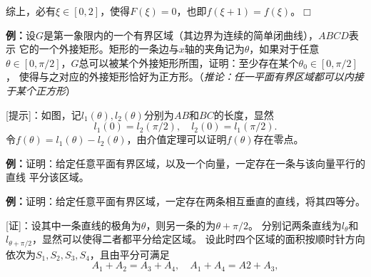 综上，必有$\xi\in[0,2]$，使得$F(\xi)=0$，也即$f(\xi+1)=f(\xi)$。\hfill $\Box$

{\bf 例：}设$G$是第一象限内的一个有界区域（其边界为连续的简单闭曲线），$ABCD$表示
它的一个外接矩形。矩形的一条边与$x$轴的夹角记为$\theta$，如果对于任意$\theta\in
[0,\pi/2]$，$G$总可以被某个外接矩形所围，证明：至少存在某个$\theta_0\in[0,\pi/2]$，
使得与之对应的外接矩形恰好为正方形。（{\it 推论：任一平面有界区域都可以内接于某个正方形}）

\begin{center}
\end{center}

[提示]：如图，记$l_1(\theta),l_2(\theta)$分别为$AB$和$BC$的长度，显然
$$l_1(0)=l_2(\pi/2),\quad l_2(0)=l_1(\pi/2).$$
令$f(\theta)=l_1(\theta)-l_2(\theta)$，由介值定理可以证明$f(\theta)$存在零点。

{\bf 例：}证明：给定任意平面有界区域，以及一个向量，一定存在一条与该向量平行的直线
平分该区域。

{\bf 例：}证明：给定任意平面有界区域，一定存在两条相互垂直的直线，将其四等分。

[证]：设其中一条直线的极角为$\theta$，则另一条的为$\theta+\pi/2$。
分别记两条直线为$l_{\theta}$和$l_{\theta+\pi/2}$，显然可以使得二者都平分给定区域。
设此时四个区域的面积按顺时针方向依次为$S_1,S_2,S_3,S_4$，且由平分可满足
$$A_1+A_2=A_3+A_4,\quad A_1+A_4=A2+A_3,$$

